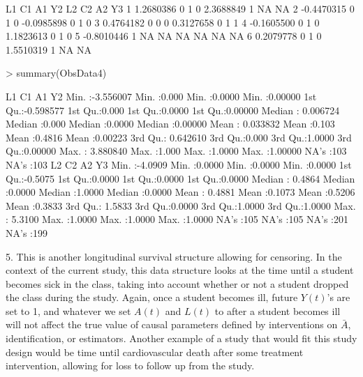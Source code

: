 \documentclass[answers]{exam}
\begin{document}
\begin{solution}
\begin{Schunk}
\begin{Soutput}
          L1 C1 A1 Y2         L2 C2 A2 Y3
1  1.2680386  0  1  0  2.3688849  1 NA NA
2 -0.4470315  0  1  0 -0.0985898  0  1  0
3  0.4764182  0  0  0  0.3127658  0  1  1
4 -0.1605500  0  1  0  1.1823613  0  1  0
5 -0.8010446  1 NA NA         NA NA NA NA
6  0.2079778  0  1  0  1.5510319  1 NA NA
\end{Soutput}
\begin{Sinput}
> summary(ObsData4)
\end{Sinput}
\begin{Soutput}
       L1                  C1              A1               Y2         
 Min.   :-3.556007   Min.   :0.000   Min.   :0.0000   Min.   :0.00000  
 1st Qu.:-0.598577   1st Qu.:0.000   1st Qu.:0.0000   1st Qu.:0.00000  
 Median : 0.006724   Median :0.000   Median :0.0000   Median :0.00000  
 Mean   : 0.033832   Mean   :0.103   Mean   :0.4816   Mean   :0.00223  
 3rd Qu.: 0.642610   3rd Qu.:0.000   3rd Qu.:1.0000   3rd Qu.:0.00000  
 Max.   : 3.880840   Max.   :1.000   Max.   :1.0000   Max.   :1.00000  
                                     NA's   :103      NA's   :103      
       L2                C2               A2               Y3        
 Min.   :-4.0909   Min.   :0.0000   Min.   :0.0000   Min.   :0.0000  
 1st Qu.:-0.5075   1st Qu.:0.0000   1st Qu.:0.0000   1st Qu.:0.0000  
 Median : 0.4864   Median :0.0000   Median :1.0000   Median :0.0000  
 Mean   : 0.4881   Mean   :0.1073   Mean   :0.5206   Mean   :0.3833  
 3rd Qu.: 1.5833   3rd Qu.:0.0000   3rd Qu.:1.0000   3rd Qu.:1.0000  
 Max.   : 5.3100   Max.   :1.0000   Max.   :1.0000   Max.   :1.0000  
 NA's   :105       NA's   :105      NA's   :201      NA's   :199     
\end{Soutput}
\end{Schunk}

5. This is another longitudinal survival structure allowing for censoring. In the context of the current study, this data structure looks at the time until a student becomes sick in the class, taking into account whether or not a student dropped the class during the study. Again, once a student becomes ill, future $Y(t)$'s are set to 1, and whatever we set $A(t)$ and $L(t)$ to after a student becomes ill will not affect the true value of causal parameters defined by interventions on $\bar{A}$, identification, or estimators. Another example of a study that would fit this study design would be time until cardiovascular death after some treatment intervention, allowing for loss to follow up from the study.


\end{solution}
\end{document}
